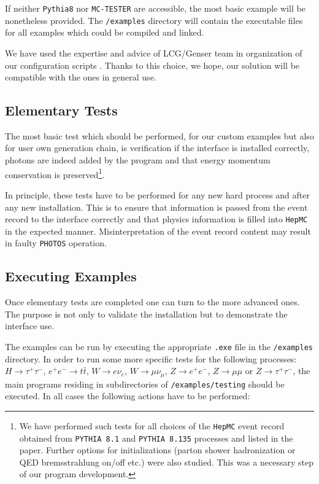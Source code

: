 \documentclass[]{Photos_interface_design}
\begin{document}
If neither {\tt Pythia8} nor {\tt MC-TESTER} are accessible,  the most basic
 example will be nonetheless provided. The {\tt /examples} directory will 
contain the executable files for all examples which could be compiled and 
linked.

We have used the expertise and advice 
of LCG/Genser team  in organization of our configuration scripts 
 \cite{Kirsanov:2008zz}.  Thanks to this choice, we hope, our solution
 will be compatible with the ones in general use.

\subsection{Elementary Tests}
\label{sect:elem}

The most basic test which should be performed, for our custom examples but also for  user own generation chain, 
 is verification if the interface is installed correctly, 
photons are indeed added by the program and that energy momentum 
conservation is preserved\footnote{
We have  performed such  tests for all choices of the {\tt HepMC} event record obtained 
from  {\tt PYTHIA 8.1} and {\tt PYTHIA 8.135} processes and 
listed in the paper. Further  options for initializations 
(parton shower hadronization or QED bremsstrahlung on/off etc.) were also studied.
This was a necessary step of our program development.}.

In principle, these tests have to be performed for any new hard 
process and after any new installation. This is to ensure that 
information is passed from the event record to the interface 
correctly and that physics information is filled into {\tt HepMC} 
in the expected manner. Misinterpretation of the event record content may result in 
faulty {\tt PHOTOS} operation.


\subsection{Executing Examples}

Once elementary tests are completed one can turn to the more advanced ones.
The purpose is not only to validate the installation but to demonstrate the
interface use.

The examples can be run by executing the appropriate {\tt .exe} file in the {\tt /examples} directory.
In order to run some more specific tests for the following processes:
$H \rightarrow \tau^+ \tau^-$, $ e^+ e^- \rightarrow t \bar t$,
$W \rightarrow e \nu_e$, $W \rightarrow \mu \nu_\mu$,
$Z \rightarrow e^+ e^-$, $Z \rightarrow \mu \mu$ or $Z \rightarrow \tau^+ \tau^-$,
the main programs residing in subdirectories of {\tt /examples/testing} should be executed.
In all cases the following actions have to be performed:
\end{document}
